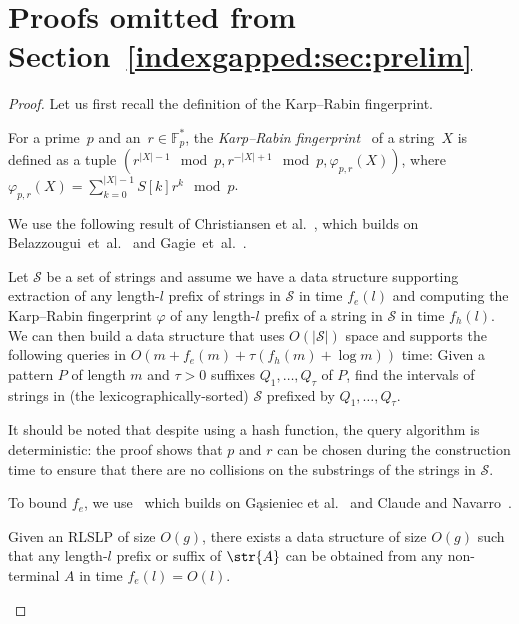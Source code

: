 \section{Proofs omitted from Section~\ref{indexgapped:sec:prelim}}\label{app:proofs}

\tries*
\begin{proof}
Let us first recall the definition of the Karp--Rabin fingerprint.

\begin{definition}
For a prime~$p$ and an~$r \in \mathbb{F}_p^\ast$, the \emph{Karp--Rabin fingerprint}~\cite{karp1987efficient} of a string~$X$ is defined as a tuple $(r^{|X|-1} \mod p, r^{-|X|+1} \mod p, \varphi_{p,r}(X))$, where $\varphi_{p,r}(X)=\sum_{k=0}^{|X|-1} S[k]r^k\mod p$.
\end{definition}

We use the following result of Christiansen et al.~\cite{talg/ChristiansenEKN21}, which builds on Belazzougui~et~al.~\cite{esa/BelazzouguiBPV10} and Gagie~et~al.~\cite{latin/GagieGKNP14,soda/GagieNP18}.
 
\begin{fact}\label{fact:compact_trie}
Let $\mathcal{S}$ be a set of strings and assume we have a data structure supporting extraction of any length-$l$ prefix of strings in $\mathcal{S}$ in
time $f_e(l)$ and computing the Karp--Rabin fingerprint $\varphi$ of any length-$l$ prefix of a string in $\mathcal{S}$
in time $f_h(l)$. We can then build a data structure that uses $O(|\mathcal{S}|)$ space and supports the following queries in $O(m + f_e (m) + \tau ( f_h (m) + \log m))$ time: Given a pattern $P$ of length $m$ and $\tau > 0$
suffixes $Q_1,\dots,Q_{\tau}$ of $P$, find the intervals of strings in (the lexicographically-sorted) $\mathcal{S}$ prefixed by
$Q_1,\dots,Q_{\tau}$.
\end{fact}

It should be noted that despite using a hash function, the query algorithm is deterministic: the proof shows that $p$ and $r$ can be chosen during the construction time to ensure that there are no collisions on the substrings of the strings in $\mathcal{S}$.  

To bound $f_e$, we use~\cite[Lemma 6.6]{talg/ChristiansenEKN21} which builds on G\k{a}sieniec et al.~\cite{dcc/GasieniecKPS05} and Claude and Navarro~\cite{spire/ClaudeN12a}.

\begin{fact}\label{fact:prefsuf_extraction} Given an RLSLP
of size $O(g)$, there exists a data structure of size $O(g)$ such that any length-$l$ prefix or suffix of $\str{A}$ can be
obtained from any non-terminal $A$ in time $f_e(l) = O(l)$.
\end{fact}


\end{proof}
